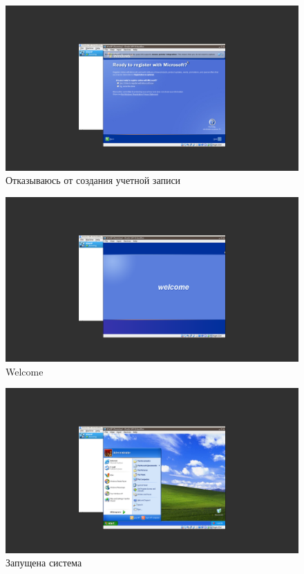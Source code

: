 \documentclass[a4paper]{article}
\begin{document}
\begin{figure}[H]
    \centering
    \includegraphics[width=\linewidth]{26.png}
    \caption{Отказываюсь от создания учетной записи}
\end{figure}

\begin{figure}[H]
    \centering
    \includegraphics[width=\linewidth]{27.png}
    \caption{Welcome}
\end{figure}

\begin{figure}[H]
    \centering
    \includegraphics[width=\linewidth]{28.png}
    \caption{Запущена система}
\end{figure}
\end{document}
